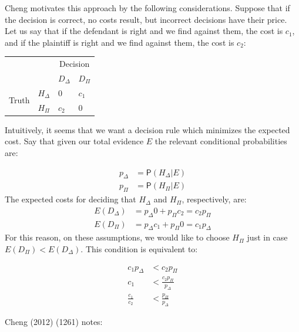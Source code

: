 \documentclass[10pt,dvipsnames,enabledeprecatedfontcommands]{scrartcl}
\newcommand{\pr}[1]{\mathsf{P}(#1)}
\begin{document}
Cheng motivates this approach by the following considerations. Suppose
that if the decision is correct, no costs result, but incorrect
decisions have their price. Let us say that if the defendant is right
and we find against them, the cost is \(c_1\), and if the plaintiff is
right and we find against them, the cost is \(c_2\):

\begin{center}
\begin{tabular}
{@{}llll@{}}
\toprule
& & \multicolumn{2}{c}{Decision}\\
& &  $D_\Delta$ & $D_\Pi$ \\
\cmidrule{3-4}
\multirow{2}{*}{Truth} &  $H_\Delta$    & $0$    & $c_1$\\
                       &  $H_\Pi$       &  $c_2$   & $0$ \\ 
\bottomrule
\end{tabular}
\end{center}

Intuitively, it seems that we want a decision rule which minimizes the
expected cost. Say that given our total evidence \(E\) the relevant
conditional probabilities are:

\vspace{-6mm}

\begin{align*}
p_\Delta &= \pr{H_\Delta \vert E} \\
p_\Pi & = \pr{H_\Pi \vert E}
\end{align*} \noindent The expected costs for deciding that \(H_\Delta\)
and \(H_\Pi\), respectively, are: \begin{align*}
E(D_\Delta) & = p_\Delta 0 + p_\Pi c_2 = c_2p_\Pi\\
E(D_\Pi) & = p_\Delta c_1 + p_\Pi 0 = c_1 p_\Delta
\end{align*} \noindent For this reason, on these assumptions, we would
like to choose \(H_\Pi\) just in case \(E(D_\Pi) < E(D_\Delta)\). This
condition is equivalent to:

\vspace{-6mm}

\begin{align}
\nonumber c_1p_\Delta &< c_2p_\Pi \\
\nonumber c_1 & < \frac{c_2p_\Pi}{p_\Delta}\\
\label{eq:cheng_frac1}\frac{c_1}{c_2} & < \frac{p_\Pi}{p_\Delta}
\end{align}

\noindent Cheng (2012) (1261) notes:
\end{document}
